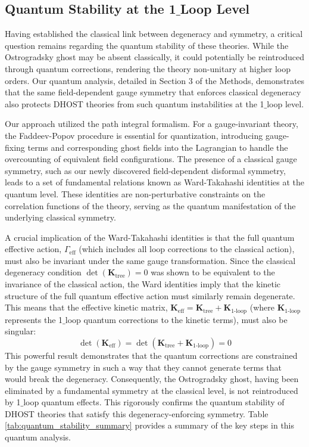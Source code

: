 \documentclass[twocolumn]{aastex631}
\begin{document}
\subsection{Quantum Stability at the 1\ensuremath{\_}Loop Level}

Having established the classical link between degeneracy and symmetry, a critical question remains regarding the quantum stability of these theories. While the Ostrogradsky ghost may be absent classically, it could potentially be reintroduced through quantum corrections, rendering the theory non-unitary at higher loop orders. Our quantum analysis, detailed in Section 3 of the Methods, demonstrates that the same field-dependent gauge symmetry that enforces classical degeneracy also protects DHOST theories from such quantum instabilities at the 1\ensuremath{\_}loop level.

Our approach utilized the path integral formalism. For a gauge-invariant theory, the Faddeev-Popov procedure is essential for quantization, introducing gauge-fixing terms and corresponding ghost fields into the Lagrangian to handle the overcounting of equivalent field configurations. The presence of a classical gauge symmetry, such as our newly discovered field-dependent disformal symmetry, leads to a set of fundamental relations known as Ward-Takahashi identities at the quantum level. These identities are non-perturbative constraints on the correlation functions of the theory, serving as the quantum manifestation of the underlying classical symmetry.

A crucial implication of the Ward-Takahashi identities is that the full quantum effective action, $\Gamma_{\text{eff}}$ (which includes all loop corrections to the classical action), must also be invariant under the same gauge transformation. Since the classical degeneracy condition $\det(\mathbf{K}_{\text{tree}}) = 0$ was shown to be equivalent to the invariance of the classical action, the Ward identities imply that the kinetic structure of the full quantum effective action must similarly remain degenerate. This means that the effective kinetic matrix, $\mathbf{K}_{\text{eff}} = \mathbf{K}_{\text{tree}} + \mathbf{K}_{\text{1-loop}}$ (where $\mathbf{K}_{\text{1-loop}}$ represents the 1\ensuremath{\_}loop quantum corrections to the kinetic terms), must also be singular:
\begin{equation}
\det(\mathbf{K}_{\text{eff}}) = \det(\mathbf{K}_{\text{tree}} + \mathbf{K}_{\text{1-loop}}) = 0
\end{equation}
This powerful result demonstrates that the quantum corrections are constrained by the gauge symmetry in such a way that they cannot generate terms that would break the degeneracy. Consequently, the Ostrogradsky ghost, having been eliminated by a fundamental symmetry at the classical level, is not reintroduced by 1\ensuremath{\_}loop quantum effects. This rigorously confirms the quantum stability of DHOST theories that satisfy this degeneracy-enforcing symmetry. Table \ref{tab:quantum_stability_summary} provides a summary of the key steps in this quantum analysis.
\end{document}
